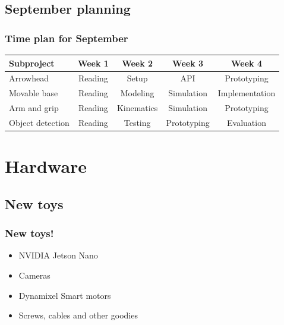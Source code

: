 \documentclass{beamer}
\begin{document}
\subsection{September planning}
\begin{frame}
    \frametitle{Time plan for September}
    \begin{table}
        \begin{tabular}{l | c | c | c | c }
        Subproject & Week 1 & Week 2 & Week 3 & Week 4 \\
        \hline \hline
            Arrowhead & Reading& Setup & API & Prototyping\\
            Movable base & Reading& Modeling & Simulation & Implementation\\
            Arm and grip  & Reading & Kinematics & Simulation& Prototyping\\
            Object detection & Reading & Testing & Prototyping & Evaluation\\
        \end{tabular}
    \end{table}
\end{frame}

\section{Hardware}
\begin{frame}
    \subsection{New toys}
    \frametitle{New toys!}
    \begin{itemize}
        \item NVIDIA Jetson Nano
        \item Cameras
        \item Dynamixel Smart motors
        \item Screws, cables and other goodies
    \end{itemize}
\end{frame}
\end{document}

